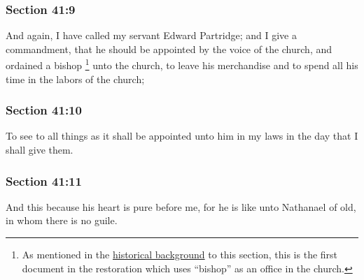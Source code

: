 	\subsubsection{Section 41:9} %
		\label{DC41-9}

		And again, I have called my servant Edward Partridge; and I give a commandment, that he should be appointed by the voice of the church, and ordained a bishop%
			\footnote{%
				As mentioned in the \hyperref[DC41-HB]{historical background} to this section, this is the first document in the restoration which uses ``bishop'' as an office in the church.
				}
		unto the church, to leave his merchandise and to spend all his time in the labors of the church;


	\subsubsection{Section 41:10} %
		\label{DC41-10}

		To see to all things as it shall be appointed unto him in my laws in the day that I shall give them.


	\subsubsection{Section 41:11} %
		\label{DC41-11}

		And this because his heart is pure before me, for he is like unto Nathanael of old, in whom there is no guile.

